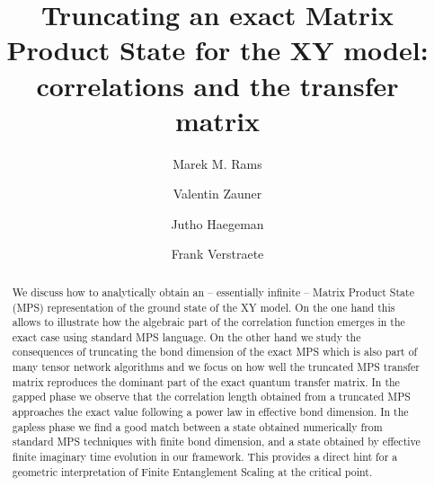 \documentclass[prl,twocolumn,showpacs,floatfix,superscriptaddress,nofootinbib]{revtex4-1}
\begin{document}
\title{Truncating an exact Matrix Product State for the XY model: \\ correlations and the transfer matrix}
\author{Marek M. Rams}

\author{Valentin Zauner}

\author{Jutho Haegeman}


\author{Frank Verstraete}

\begin{abstract}
We discuss how to analytically obtain an -- essentially infinite -- Matrix Product State (MPS) representation of the ground state of the XY model. 
On the one hand this allows to illustrate how the algebraic part of the correlation function emerges in the exact case using standard MPS language. 
On the other hand we study the consequences of truncating the bond dimension of the exact MPS which is also part of many tensor network algorithms and we focus on how well the truncated MPS transfer matrix reproduces the dominant part of the exact quantum transfer matrix. 
In the gapped phase we observe that the correlation length obtained from a truncated MPS approaches the exact value following a power law in effective bond dimension. In the gapless phase we find a good match between a state obtained numerically from standard MPS techniques with finite bond dimension, and a state obtained by effective finite imaginary time evolution in our framework. 
This provides a direct hint for a geometric interpretation of Finite Entanglement Scaling at the critical point.
\end{abstract}

\maketitle
\end{document}
